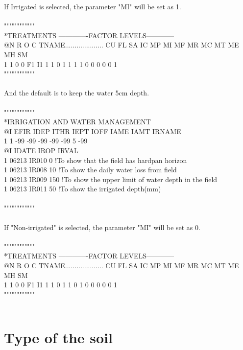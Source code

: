 \documentclass[11pt,a4j]{jarticle}
\begin{document}
If Irrigated is selected, the parameter "MI" will be set as 1.\\
\\
""""""""""""\\
*TREATMENTS                        -------------FACTOR LEVELS------------\\
@N R O C TNAME.................... CU FL SA IC MP MI MF MR MC MT ME MH SM\\
 1 1 0 0 F1 I1                      1  1  0  1  1  1  1  0  0  0  0  0  1\\
""""""""""""\\
\\
And the default is to keep the water 5cm depth.\\
\\
""""""""""""\\
*IRRIGATION AND WATER MANAGEMENT\\
@I  EFIR  IDEP  ITHR  IEPT  IOFF  IAME  IAMT IRNAME\\
 1     1   -99   -99   -99   -99   -99     5 -99\\
@I IDATE  IROP IRVAL\\
 1 06213 IR010     0  !To show that the field has hardpan horizon\\
 1 06213 IR008    10  !To show the daily water loss from field\\
 1 06213 IR009   150  !To show the upper limit of water depth in the field\\
 1 06213 IR011    50  !To show the irrigated depth(mm)\\
\\
""""""""""""\\
\\
If "Non-irrigated" is selected, the parameter "MI" will be set as 0.\\
\\
""""""""""""\\
*TREATMENTS                        -------------FACTOR LEVELS------------\\
@N R O C TNAME.................... CU FL SA IC MP MI MF MR MC MT ME MH SM\\
 1 1 0 0 F1 I1                      1  1  0  1  1  0  1  0  0  0  0  0  1\\
""""""""""""\\
\\
  \section{Type of the soil}
  
\end{document}
